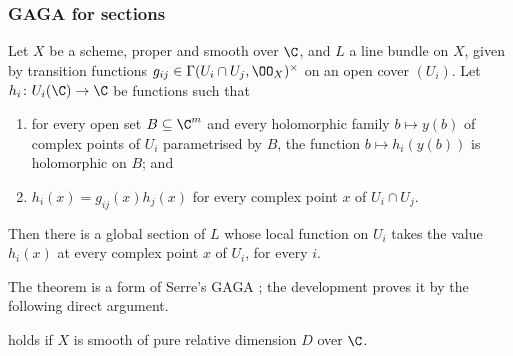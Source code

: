 \subsubsection*{GAGA for sections}

\begin{theorem}\label{pf:covol:thm:gaga}
Let $X$ be a scheme, proper and smooth over $\C$, and $L$ a line bundle on $X$, given by transition
functions $g_{ij}\in\Gamma(U_i\cap U_j,\OO_X)^\times$ on an open cover $(U_i)$. Let $h_i\colon U_i(\C)\to\C$ be
functions such that
\begin{enumerate}[label=(\roman*)]
\item for every open set $B\subseteq\C^m$ and every holomorphic family $b\mapsto y(b)$ of complex points of
  $U_i$ parametrised by $B$, the function $b\mapsto h_i(y(b))$ is holomorphic on $B$; and
\item $h_i(x)=g_{ij}(x)h_j(x)$ for every complex point $x$ of $U_i\cap U_j$.
\end{enumerate}
Then there is a global section of $L$ whose local function on $U_i$ takes the value $h_i(x)$ at every complex
point $x$ of $U_i$, for every $i$.
\end{theorem}

The theorem is a form of Serre's GAGA \cite{Serre1956}; the development proves it by the following direct
argument.

\begin{lemma}\label{pf:covol:lem:gagapure}
 holds if $X$ is smooth of pure relative dimension $D$ over $\C$.
\end{lemma}

